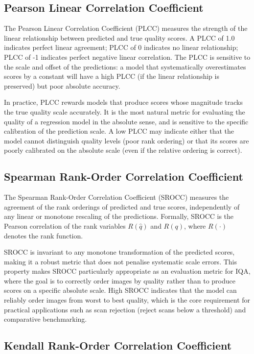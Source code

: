 \subsection{Pearson Linear Correlation Coefficient}

The Pearson Linear Correlation Coefficient (PLCC) measures the strength of the linear
relationship between predicted and true quality scores. A PLCC of 1.0 indicates perfect
linear agreement; PLCC of 0 indicates no linear relationship; PLCC of -1 indicates
perfect negative linear correlation. The PLCC is sensitive to the scale and offset of
the predictions: a model that systematically overestimates scores by a constant will
have a high PLCC (if the linear relationship is preserved) but poor absolute accuracy.

In practice, PLCC rewards models that produce scores whose magnitude tracks the true
quality scale accurately. It is the most natural metric for evaluating the quality of
a regression model in the absolute sense, and is sensitive to the specific calibration
of the prediction scale. A low PLCC may indicate either that the model cannot distinguish
quality levels (poor rank ordering) or that its scores are poorly calibrated on the
absolute scale (even if the relative ordering is correct).

\subsection{Spearman Rank-Order Correlation Coefficient}

The Spearman Rank-Order Correlation Coefficient (SROCC) measures the agreement of the
rank orderings of predicted and true scores, independently of any linear or monotone
rescaling of the predictions. Formally, SROCC is the Pearson correlation of the rank
variables $R(\hat{q})$ and $R(q)$, where $R(\cdot)$ denotes the rank function.

SROCC is invariant to any monotone transformation of the predicted scores, making it
a robust metric that does not penalise systematic scale errors. This property makes
SROCC particularly appropriate as an evaluation metric for IQA, where the goal is to
correctly order images by quality rather than to produce scores on a specific absolute
scale. High SROCC indicates that the model can reliably order images from worst to best
quality, which is the core requirement for practical applications such as scan rejection
(reject scans below a threshold) and comparative benchmarking.

\subsection{Kendall Rank-Order Correlation Coefficient}

